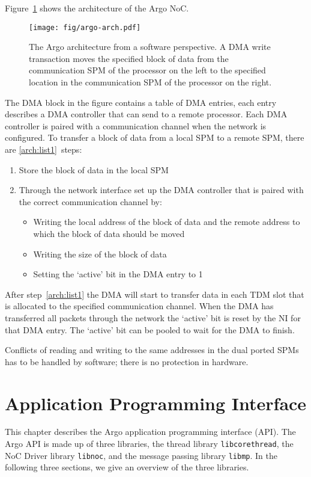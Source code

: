 \documentclass[a4paper,fontsize=10pt,twoside,DIV15,BCOR12mm,headinclude=true,footinclude=false,pagesize,bibtotoc]{scrbook}
\newcommand{\code}[1]{{\texttt{#1}}}
\begin{document}
Figure~\ref{fig:argo-arch} shows the architecture of the Argo NoC.
\begin{figure}[b!]
\centering
\texttt{[image: fig/argo-arch.pdf]}
\caption{The Argo architecture from a software perspective.
A DMA write transaction moves the specified block of data from the
communication SPM of the processor on the left to the specified
location in the communication SPM of the processor on the right.}
\label{fig:argo-arch}
\end{figure}
The DMA block in the figure contains a table of DMA entries,
each entry describes a DMA controller that can send to a remote processor.
Each DMA controller is paired with a communication channel when the network is configured. 
To transfer a block of data from a local SPM to a remote SPM, there are \ref{arch:list1}~steps:
\begin{enumerate}
\item Store the block of data in the local SPM
\item Through the network interface set up the DMA controller that is paired with the correct communication channel by:
  \begin{itemize}
  \item Writing the local address of the block of data and the remote address to which the block of data should be moved
  \item Writing the size of the block of data
  \item Setting the `active' bit in the DMA entry to 1
  \end{itemize}
\label{arch:list1}\end{enumerate}
After step~\ref{arch:list1} the DMA will start to transfer data in each TDM slot that is allocated to the specified communication channel.
When the DMA has transferred all packets through the network the `active' bit is reset by the NI for that DMA entry. The `active' bit can be pooled to wait for the DMA to finish.

Conflicts of reading and writing to the same addresses in the dual
ported SPMs has to be handled by software; there is no protection in hardware.


\chapter{Application Programming Interface}
\label{chap:api}
This chapter describes the Argo application programming interface (API).
The Argo API is made up of three libraries, the thread library \code{libcorethread}, the NoC Driver library \code{libnoc}, and the message passing library \code{libmp}. In the following three sections, we give an overview of the three libraries.
\end{document}
